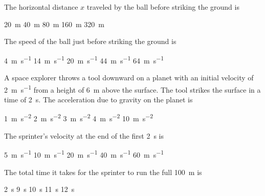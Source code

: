 \documentclass{../../../oss-ap12ibhl}
\begin{document}
\begin{questions}
  \question The horizontal distance $x$ traveled by the ball before striking the
  ground is
  \begin{choices}
    \choice\SI{20}{\metre}
    \choice\SI{40}{\metre}
    \choice\SI{80}{\metre} 
    \choice\SI{160}{\metre}
    \choice\SI{320}{\metre}
  \end{choices}

  \question The speed of the ball just before striking the ground is
  \begin{choices}
    \choice\SI{4}{\metre\per\second}
    \choice\SI{14}{\metre\per\second}
    \choice\SI{20}{\metre\per\second}
    \choice\SI{44}{\metre\per\second}
    \choice\SI{64}{\metre\per\second}
  \end{choices}

  \question A space explorer throws a tool downward on a planet with an initial
  velocity of \SI{2}{\metre\per\second} from a height of \SI{6}{\metre}
  above the surface. The tool strikes the surface in a time of \SI{2}{\second}.
  The acceleration due to gravity on the planet is
  \begin{choices}
    \choice\SI{1}{\metre\per\second\squared}
    \choice\SI{2}{\metre\per\second\squared}
    \choice\SI{3}{\metre\per\second\squared}
    \choice\SI{4}{\metre\per\second\squared}
    \choice\SI{10}{\metre\per\second\squared}
  \end{choices}

  
  \question The sprinter's velocity at the end of the first \SI{2}{\second} is
  \begin{choices}
    \choice\SI{5 }{\metre\per\second}
    \choice\SI{10}{\metre\per\second}
    \choice\SI{20}{\metre\per\second}
    \choice\SI{40}{\metre\per\second}
    \choice\SI{60}{\metre\per\second}
  \end{choices}
  \label{q:sprinter1}

  \question The total time it takes for the sprinter to run the full
  \SI{100}{\metre} is
  \begin{choices}
    \choice\SI{2}{\second}
    \choice\SI{9}{\second}
    \choice\SI{10}{\second}
    \choice\SI{11}{\second}
    \choice\SI{12}{\second}
  \end{choices}
  \label{q:sprinter2}
    

\end{questions}
\end{document}
